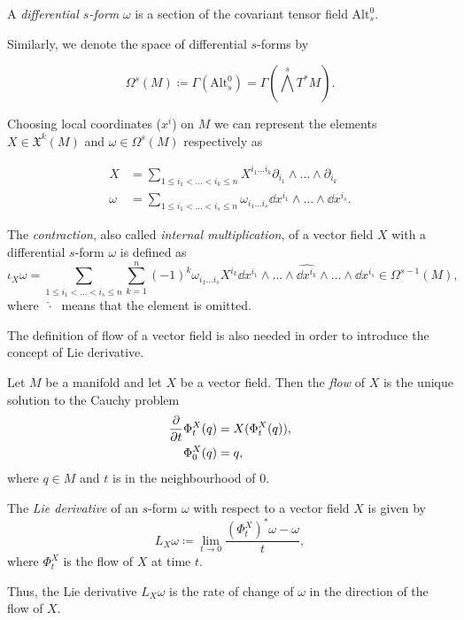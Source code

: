 \begin{definition}
    A \emph{differential $s$-form} $\omega$ is a section of the covariant tensor field $\text{Alt}_s ^0$.
\end{definition}

Similarly, we denote the space of differential $s$-forms by

\begin{equation*}
    \Omega ^s(M) \coloneqq \Gamma (\text{Alt}_s ^0 ) = \Gamma \left( \bigwedge ^s T^*M \right).
\end{equation*}

Choosing local coordinates ($x^i$) on $M$ we can represent the elements $X \in \mathfrak{X}^k(M)$ and $\omega \in \Omega^s(M)$ respectively as

\begin{align*}
    X &= \sum_{1 \leq i_1 < \ldots < i_k \leq n} X^{i_1 \ldots i_k} \partial_{i_1} \wedge \ldots \wedge \partial_{i_k} \\
    \omega &= \sum_{1 \leq i_1 < \ldots < i_s \leq n} \omega_{i_1 \ldots i_s} \dd x^{i_1} \wedge \ldots \wedge \dd x^{i_s}.
\end{align*}

\begin{definition}
    The \emph{contraction}, also called \emph{internal multiplication}, of a vector field $X$ with a differential $s$-form $\omega$ is defined as
    \begin{equation*}
        \iota_X \omega =
        \sum_{1\leq i_1 < \ldots < i_s \leq n} \sum_{k=1}^n (-1)^k
        \omega_{i_1 \ldots i_s} X^{i_k}
        \dd x^{i_1} \wedge \ldots \wedge \widehat{\dd x^{i_k}} \wedge \ldots \wedge \dd x^{i_s}
        \in \Omega^{s-1}(M),
    \end{equation*}
    where $\; \widehat{\cdot} \;$ means that the element is omitted.
\end{definition}

The definition of flow of a vector field is also needed in order to introduce the concept of Lie derivative.

\begin{definition}
    Let $M$ be a manifold and let $X$ be a vector field.
    Then the \emph{flow} of $X$ is the unique solution to the Cauchy problem
    \begin{align*}
        \pderivative{t} \Phi _t ^X (q) &= X(\Phi_t ^X (q)), \\
        \Phi_0 ^X (q) &= q,
    \end{align*}
    where $q \in M$ and $t$ is in the neighbourhood of $0$.
\end{definition}

\begin{definition}
    The \emph{Lie derivative} of an $s$-form $\omega$ with respect to a vector field $X$ is given by
    \begin{equation*}
        L_X \omega \coloneqq \lim _{t \rightarrow 0} \frac{(\Phi_t ^X)^* \omega - \omega}{t},
    \end{equation*}
    where $\Phi_t ^X$ is the flow of $X$ at time $t$.
\end{definition}

Thus, the Lie derivative $L_X \omega$ is the rate of change of $\omega$ in the direction of the flow of $X$.
